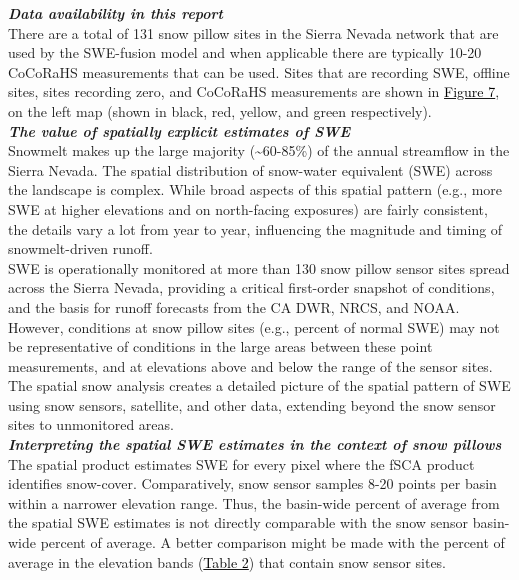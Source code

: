 \documentclass{article}
\begin{document}
\noindent\textbf{\textit{Data availability in this report}}\\
There are a total of 131 snow pillow sites in the Sierra Nevada network that are used by the SWE-fusion model and when applicable there are typically 10-20 CoCoRaHS measurements that can be used. Sites that are recording SWE, offline sites, sites recording zero, and CoCoRaHS measurements are shown in \hyperref[sec:figure_7]{\textcolor{black}{Figure 7}}, on the left map (shown in black, red, yellow, and green respectively).\\

\noindent\textbf{\textit{The value of spatially explicit estimates of SWE}}\\
Snowmelt makes up the large majority (\textasciitilde60-85\%) of the annual streamflow in the Sierra Nevada. The spatial distribution of snow-water equivalent (SWE) across the landscape is complex. While broad aspects of this spatial pattern (e.g., more SWE at higher elevations and on north-facing exposures) are fairly consistent, the details vary a lot from year to year, influencing the magnitude and timing of snowmelt-driven runoff.\\

\noindent SWE is operationally monitored at more than 130 snow pillow sensor sites spread across the Sierra Nevada, providing a critical first-order snapshot of conditions, and the basis for runoff forecasts from the CA DWR, NRCS, and NOAA. However, conditions at snow pillow sites (e.g., percent of normal SWE) may not be representative of conditions in the large areas between these point measurements, and at elevations above and below the range of the sensor sites. The spatial snow analysis creates a detailed picture of the spatial pattern of SWE using snow sensors, satellite, and other data, extending beyond the snow sensor sites to unmonitored areas.\\

\noindent\textbf{\textit{Interpreting the spatial SWE estimates in the context of snow pillows}}\\
The spatial product estimates SWE for every pixel where the fSCA product identifies snow-cover. Comparatively, snow sensor samples 8-20 points per basin within a narrower elevation range. Thus, the basin-wide percent of average from the spatial SWE estimates is not directly comparable with the snow sensor basin-wide percent of average. A better comparison might be made with the percent of average in the elevation bands (\hyperref[sec:table_2]{\textcolor{black}{Table 2}}) that contain snow sensor sites.
\end{document}
